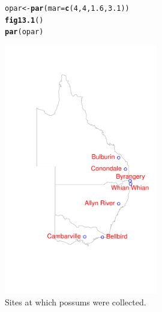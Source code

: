 \documentclass[12pt, a4paper,  BCOR=8.25mm, DIV=15]{scrartcl}\usepackage[]{graphicx}\usepackage[]{color}
\makeatletter
\newcommand{\hlnum}[1]{\textcolor[rgb]{0.686,0.059,0.569}{#1}}%
\newcommand{\hlstd}[1]{\textcolor[rgb]{0.345,0.345,0.345}{#1}}%
\newcommand{\hlkwb}[1]{\textcolor[rgb]{0.69,0.353,0.396}{#1}}%
\newcommand{\hlkwc}[1]{\textcolor[rgb]{0.333,0.667,0.333}{#1}}%
\newcommand{\hlkwd}[1]{\textcolor[rgb]{0.737,0.353,0.396}{\textbf{#1}}}%
\newenvironment{kframe}{%
 \def\at@end@of@kframe{}%
 \ifinner\ifhmode%
  \def\at@end@of@kframe{\end{minipage}}%
  \begin{minipage}{\columnwidth}%
 \fi\fi%
 \def\FrameCommand##1{\hskip\@totalleftmargin \hskip-\fboxsep
 \colorbox{shadecolor}{##1}\hskip-\fboxsep
     \hskip-\linewidth \hskip-\@totalleftmargin \hskip\columnwidth}%
 \MakeFramed {\advance\hsize-\width
   \@totalleftmargin\z@ \linewidth\hsize
   \@setminipage}}%
 {\par\unskip\endMakeFramed%
 \at@end@of@kframe}
\newenvironment{knitrout}{}{} %
\makeatother
\begin{document}
\begin{figure}
\begin{knitrout}
\color{fgcolor}\begin{kframe}
\begin{alltt}
\hlstd{opar} \hlkwb{<-} \hlkwd{par}\hlstd{(}\hlkwc{mar}\hlstd{=}\hlkwd{c}\hlstd{(}\hlnum{4}\hlstd{,}\hlnum{4}\hlstd{,}\hlnum{1.6}\hlstd{,}\hlnum{3.1}\hlstd{))}
\hlkwd{fig13.1}\hlstd{()}
\hlkwd{par}\hlstd{(opar)}
\end{alltt}
\end{kframe}

{\centering \includegraphics[width=0.6\textwidth]{figs/map-oz-sites-13_1-1} 

}



\end{knitrout}

\caption{Sites at which possums were collected.\label{fig:possumsites}}
\end{figure}
\end{document}
